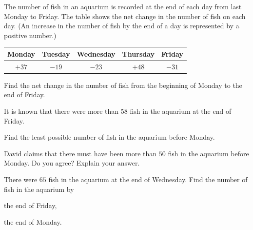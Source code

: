  The number of fish in an aquarium is recorded at the end of each day from last Monday to Friday. The table shows the net change in the number of fish on each day. (An increase in the number of fish by the end of a day is represented by a positive number.)

\begin{center}
\begin{tabular}{|c|c|c|c|c|}
\hline
\textbf{Monday} & \textbf{Tuesday} & \textbf{Wednesday} & \textbf{Thursday} & \textbf{Friday} \\
\hline
$+37$ & $-19$ & $-23$ & $+48$ & $-31$ \\
\hline
\end{tabular}
\end{center}

\begin{subparts}
  \item Find the net change in the number of fish from the beginning of Monday to the end of Friday.

  \item It is known that there were more than $58$ fish in the aquarium at the end of Friday.
  \begin{subpartsii}[1]
    \item Find the least possible number of fish in the aquarium before Monday.
    \item David claims that there must have been more than $50$ fish in the aquarium before Monday. Do you agree? Explain your answer.
  \end{subpartsii}

  \item There were $65$ fish in the aquarium at the end of Wednesday. Find the number of fish in the aquarium by
  \begin{subpartsii}[1]
    \item the end of Friday,
    \item the end of Monday.
  \end{subpartsii}
\end{subparts}

